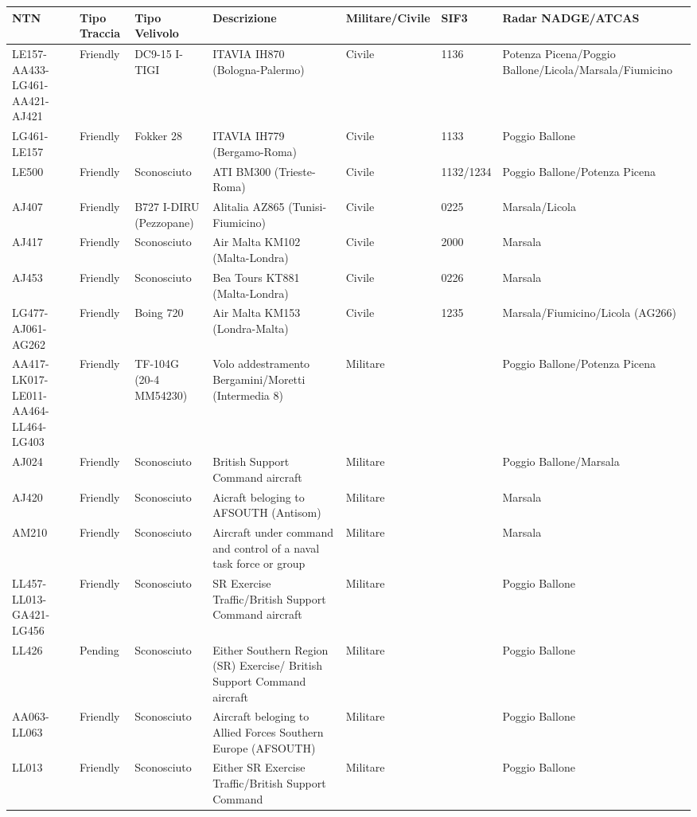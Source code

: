 \documentclass[
]{article}
\author{}
\date{}
\begin{document}
\begin{longtable}[]{@{}lllllll@{}}
\toprule
NTN & Tipo Traccia & Tipo Velivolo & Descrizione & Militare/Civile &
SIF3 & Radar NADGE/ATCAS \\
\midrule
\endhead
LE157-AA433-LG461-AA421-AJ421 & Friendly & DC9-15 I-TIGI & ITAVIA IH870
(Bologna-Palermo) & Civile & 1136 & Potenza Picena/Poggio
Ballone/Licola/Marsala/Fiumicino \\
LG461-LE157 & Friendly & Fokker 28 & ITAVIA IH779 (Bergamo-Roma) &
Civile & 1133 & Poggio Ballone \\
LE500 & Friendly & Sconosciuto & ATI BM300 (Trieste-Roma) & Civile &
1132/1234 & Poggio Ballone/Potenza Picena \\
AJ407 & Friendly & B727 I-DIRU (Pezzopane) & Alitalia AZ865
(Tunisi-Fiumicino) & Civile & 0225 & Marsala/Licola \\
AJ417 & Friendly & Sconosciuto & Air Malta KM102 (Malta-Londra) & Civile
& 2000 & Marsala \\
AJ453 & Friendly & Sconosciuto & Bea Tours KT881 (Malta-Londra) & Civile
& 0226 & Marsala \\
LG477-AJ061-AG262 & Friendly & Boing 720 & Air Malta KM153
(Londra-Malta) & Civile & 1235 & Marsala/Fiumicino/Licola (AG266) \\
AA417-LK017-LE011-AA464-LL464-LG403 & Friendly & TF-104G (20-4 MM54230)
& Volo addestramento Bergamini/Moretti (Intermedia 8) & Militare & &
Poggio Ballone/Potenza Picena \\
AJ024 & Friendly & Sconosciuto & British Support Command aircraft &
Militare & & Poggio Ballone/Marsala \\
AJ420 & Friendly & Sconosciuto & Aicraft beloging to AFSOUTH (Antisom) &
Militare & & Marsala \\
AM210 & Friendly & Sconosciuto & Aircraft under command and control of a
naval task force or group & Militare & & Marsala \\
LL457-LL013-GA421-LG456 & Friendly & Sconosciuto & SR Exercise
Traffic/British Support Command aircraft & Militare & & Poggio
Ballone \\
LL426 & Pending & Sconosciuto & Either Southern Region (SR) Exercise/
British Support Command aircraft & Militare & & Poggio Ballone \\
AA063-LL063 & Friendly & Sconosciuto & Aircraft beloging to Allied
Forces Southern Europe (AFSOUTH) & Militare & & Poggio Ballone \\
LL013 & Friendly & Sconosciuto & Either SR Exercise Traffic/British
Support Command & Militare & & Poggio Ballone \\

\end{longtable}
\end{document}
